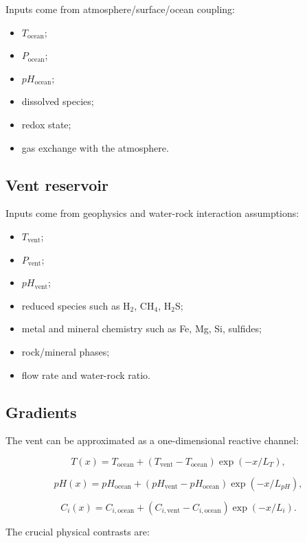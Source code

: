 \documentclass[11pt]{article}
\begin{document}
Inputs come from atmosphere/surface/ocean coupling:

\begin{itemize}
  \item \(T_{\mathrm{ocean}}\);
  \item \(P_{\mathrm{ocean}}\);
  \item \(pH_{\mathrm{ocean}}\);
  \item dissolved species;
  \item redox state;
  \item gas exchange with the atmosphere.
\end{itemize}

\subsection{Vent reservoir}

Inputs come from geophysics and water-rock interaction assumptions:

\begin{itemize}
  \item \(T_{\mathrm{vent}}\);
  \item \(P_{\mathrm{vent}}\);
  \item \(pH_{\mathrm{vent}}\);
  \item reduced species such as \(\mathrm{H_2}\), \(\mathrm{CH_4}\),
        \(\mathrm{H_2S}\);
  \item metal and mineral chemistry such as Fe, Mg, Si, sulfides;
  \item rock/mineral phases;
  \item flow rate and water-rock ratio.
\end{itemize}

\subsection{Gradients}

The vent can be approximated as a one-dimensional reactive channel:

\[
T(x) = T_{\mathrm{ocean}} +
\left(T_{\mathrm{vent}} - T_{\mathrm{ocean}}\right)
\exp(-x/L_T),
\]

\[
pH(x) = pH_{\mathrm{ocean}} +
\left(pH_{\mathrm{vent}} - pH_{\mathrm{ocean}}\right)
\exp(-x/L_{pH}),
\]

\[
C_i(x) = C_{i,\mathrm{ocean}} +
\left(C_{i,\mathrm{vent}} - C_{i,\mathrm{ocean}}\right)
\exp(-x/L_i).
\]

The crucial physical contrasts are:
\end{document}
